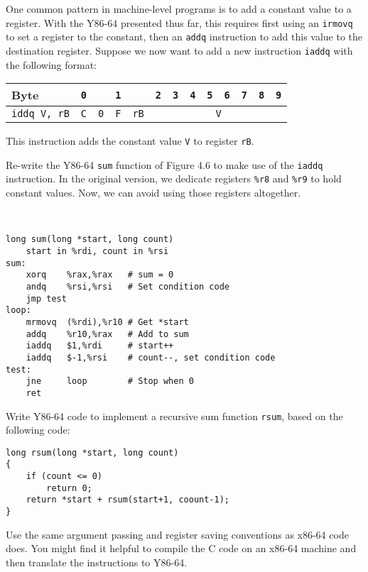 \documentclass[12pt]{article}
\newenvironment{ex}[2][Exercise]{\begin{trivlist}
		\item[\hskip \labelsep {\bfseries #1}\hskip \labelsep {\bfseries #2.}]}{\end{trivlist}}
\newenvironment{sol}[1][Solution]{\begin{trivlist}
		\item[\hskip \labelsep {\bfseries #1:}]}{\end{trivlist}}
\begin{document}
\begin{ex}{4.3}
	One common pattern in machine-level programs is to add a constant value to
	a register. With the Y86-64 presented thus far, this requires first using
	an \texttt{irmovq} to set a register to the constant, then an \texttt{addq}
	instruction to add this value to the destination register. Suppose we now
	want to add a new instruction \texttt{iaddq} with the following format:
	\begin{center}
		\begin{tabular}{l|l|l|l|l|llllllll}
			Byte & \texttt{0} & {} & \texttt{1} & {} & \texttt{2} & \texttt{3} & \texttt{4} & \texttt{5} & \texttt{6} & \texttt{7} & \texttt{8} & \texttt{9}\\
			\hline
			\texttt{iddq V, rB} & \texttt{C} & \texttt{0} & \texttt{F} & \texttt{rB} & \multicolumn{8}{c}{\texttt{V}}\\
			\hline
		\end{tabular}
	\end{center}
	This instruction adds the constant value \texttt{V} to register \texttt{rB}.
	\
	
	Re-write the Y86-64 \texttt{sum} function of Figure 4.6 to make use of the
	\texttt{iaddq} instruction. In the original version, we dedicate registers
	\texttt{\%r8} and \texttt{\%r9} to hold constant values. Now, we can avoid
	using those registers altogether.
\end{ex}

\begin{sol}
	\
	\begin{lstlisting}[language={}]
	long sum(long *start, long count)
	start in %rdi, count in %rsi
sum:
	xorq	%rax,%rax	# sum = 0
	andq	%rsi,%rsi	# Set condition code
	jmp test
loop:
	mrmovq	(%rdi),%r10	# Get *start
	addq	%r10,%rax	# Add to sum
	iaddq	$1,%rdi		# start++
	iaddq	$-1,%rsi	# count--, set condition code
test:
	jne		loop		# Stop when 0
	ret
	\end{lstlisting}
\end{sol}

\begin{ex}{4.4}
	Write Y86-64 code to implement a recursive sum function \texttt{rsum},
	based on the following code:
	
	\begin{lstlisting}
long rsum(long *start, long count)
{
	if (count <= 0)
		return 0;
	return *start + rsum(start+1, coount-1);
}
	\end{lstlisting}
	Use the same argument passing and register saving conventions as x86-64
	code does. You might find it helpful to compile the C code on an
	x86-64 machine and then translate the instructions to Y86-64.
\end{ex}
\end{document}
